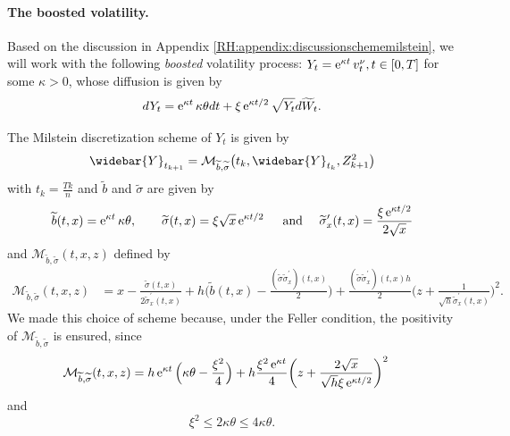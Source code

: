 \paragraph{The boosted volatility.}
Based on the discussion in Appendix \ref{RH:appendix:discussionschememilstein}, we will work with the following \textit{boosted} volatility process: $Y_t = \operatorname{e}^{\kappa t} v_t^{\nu}, t \in [0,T]$ for some $\kappa > 0$, whose diffusion is given by
\begin{equation}
	d Y_t = \operatorname{e}^{\kappa t} \kappa \theta dt + \xi \operatorname{e}^{\kappa t / 2} \sqrt{Y_t} d \widetilde W_t.
\end{equation}

The Milstein discretization scheme of $Y_t$ is given by
\begin{equation}\label{RH:discretized_boostedvol}
	\widebar{Y}_{t_{k+1}} = \mathcal{M}_{\widetilde b, \widetilde \sigma} \big( t_k, \widebar{Y}_{t_k}, Z_{k+1}^2 \big)
\end{equation}
with $t_k = \frac{T k}{n}$ and $\widetilde b$ and $\widetilde \sigma$ are given by
\begin{equation}\label{RH:drift_and_vol_boostedvol}
	\widetilde b(t,x) = \operatorname{e}^{\kappa t} \kappa \theta, \qquad \widetilde \sigma(t,x) = \xi \sqrt{x} \operatorname{e}^{\kappa t / 2} \quad \textrm{ and } \quad \widetilde \sigma_{x}^{\prime} (t,x) = \frac{\xi \operatorname{e}^{\kappa t / 2}}{2 \sqrt{x}}
\end{equation}
and $\mathcal{M}_{\widetilde b,\widetilde \sigma} (t,x,z)$ defined by
\begin{equation}\label{RH:MilsteinScheme}
	\begin{aligned}
		\mathcal{M}_{\widetilde b,\widetilde \sigma} (t,x,z)
		 & = x - \frac{ \widetilde \sigma(t,x)}{2 \widetilde \sigma_{x}^{\prime} (t,x)} + h \bigg(\widetilde b(t, x) - \frac{ (\widetilde \sigma \widetilde \sigma_{x}^{\prime}) (t,x)}{2}\bigg) + \frac{ (\widetilde \sigma \widetilde \sigma_{x}^{\prime}) (t,x) h}{2} \bigg( z + \frac{1}{\sqrt{h} \widetilde \sigma_{x}^{\prime} (t,x)} \bigg)^2.
	\end{aligned}
\end{equation}
We made this choice of scheme because, under the Feller condition, the positivity of $\mathcal{M}_{\widetilde b,\widetilde \sigma}$ is ensured, since
\begin{equation}\label{RH:MilsteinScheme_with_specificationmodel}
	\begin{aligned}
		\mathcal{M}_{\widetilde b,\widetilde \sigma} (t,x,z)
		 & = h \operatorname{e}^{\kappa t} \Big( \kappa \theta - \frac{\xi^2}{4} \Big) + h \frac{\xi^2 \operatorname{e}^{\kappa t}}{4} \bigg( z + \frac{2 \sqrt{x}}{\sqrt{h} \xi \operatorname{e}^{ \kappa t / 2} } \bigg)^2
	\end{aligned}
\end{equation}
and
\begin{equation*}
	\xi^2 \leq 2 \kappa \theta \leq 4 \kappa \theta.
\end{equation*}

